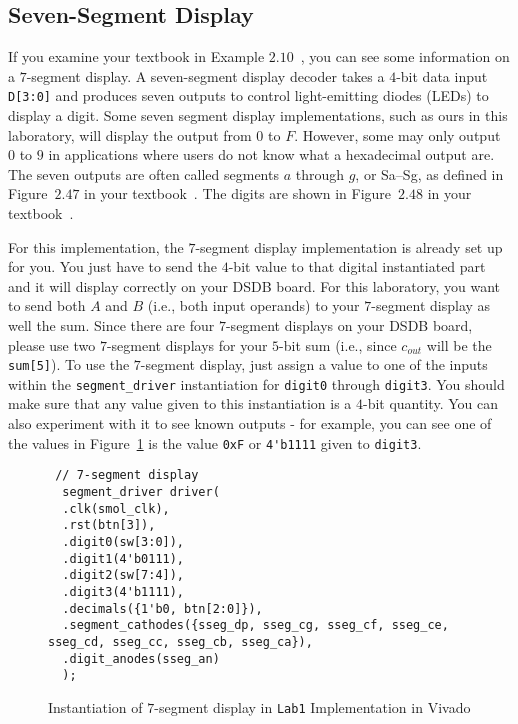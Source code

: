 \documentclass{article}
\begin{document}
\subsection{Seven-Segment Display}

If you examine your textbook in Example $2.10$~\cite{ddca-riscv},
you can see some
information on a $7$-segment display.
A seven-segment display decoder takes a $4$-bit data input
\verb!D[3:0]! and produces seven outputs to control light-emitting
diodes (LEDs) to display a digit.
Some seven segment display implementations, such as ours in this
laboratory, will display the output from $0$ to $F$.  However, some
may only output $0$ to $9$ in applications where users do not know
what a hexadecimal output are.
The seven outputs are often
called segments $a$ through $g$, or Sa–Sg, as defined in Figure~$2.47$ in
your textbook~\cite{ddca-riscv}. The
digits are shown in Figure~$2.48$ in your textbook~\cite{ddca-riscv}.

For this implementation, the $7$-segment display implementation is
already set up for you.  You just have to send the $4$-bit value to
that digital instantiated part and it will display correctly on your
DSDB board.  For this laboratory, you want to send both $A$ and $B$
(i.e., both input operands) to your $7$-segment display as well the
sum.  Since there are four $7$-segment displays on your DSDB board,
please use two $7$-segment
displays for your $5$-bit sum (i.e., since $c_{out}$
will be the \verb!sum[5]!).  To use the $7$-segment display, just
assign a value to one of the inputs within the \verb!segment_driver!
instantiation for
\verb!digit0! through \verb!digit3!.  You should make sure that any value
given to this instantiation is a $4$-bit quantity.  You can also experiment
with it to see known outputs - for example, you can see one of the
values in
Figure~\ref{demo.fig} is the value \verb!0xF! or \verb!4'b1111!
given to \verb!digit3!.
\begin{figure}
{\small
\begin{verbatim}
 // 7-segment display
  segment_driver driver(
  .clk(smol_clk),
  .rst(btn[3]),
  .digit0(sw[3:0]),
  .digit1(4'b0111),
  .digit2(sw[7:4]),
  .digit3(4'b1111),
  .decimals({1'b0, btn[2:0]}),
  .segment_cathodes({sseg_dp, sseg_cg, sseg_cf, sseg_ce, sseg_cd, sseg_cc, sseg_cb, sseg_ca}),
  .digit_anodes(sseg_an)
  );
\end{verbatim}
}
\cprotect\caption{Instantiation of $7$-segment display in
  \verb!Lab1! Implementation in Vivado}
\label{demo.fig}
\end{figure}
\end{document}
